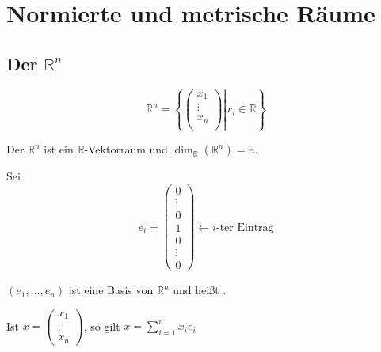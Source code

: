 

\newcommand{\Semester}{SoSe 2015}
\newcommand{\fach}{Analysis 2}
\newcommand{\prof}{Prof.\ Ebert}





\maketitle
\cleardoubleoddemptypage



\newpage

\tableofcontents
\cleardoubleoddemptypage
{}
\setcounter{page}{1}


\section{Normierte und metrische Räume} %
\label{sec:Normierte und metrische Raeume}

\subsection{Der $\mathbb{R}^n$} %
\label{sub:der_mathbb_r_n}

\[
	\mathbb{R}^n = \left\{ \left. \begin{pmatrix} x_1 \\ \vdots \\ x_n \\ \end{pmatrix}  \right| x_i \in \mathbb{R} \right\}
\]

Der $\mathbb{R}^n$ ist ein $\mathbb{R}$-Vektorraum und $\dim_{\mathbb{R}}(\mathbb{R}^n)=n$.

Sei
\[
	e_i = \begin{pmatrix} 0 \\ \vdots \\ 0 \\ 1 \\ 0 \\ \vdots \\ 0 \end{pmatrix} \leftarrow \text{$i$-ter Eintrag}
\]

\((e_1,\dots,e_n)\) ist eine Basis von $\mathbb{R}^n$ und heißt . 

Ist \(x = \begin{pmatrix} x_1 \\ \vdots \\ x_n \end{pmatrix}\), so gilt \(x=\sum\limits^{n}_{i=1}x_ie_i\)

